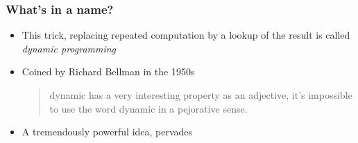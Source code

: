 \documentclass[presentation]{beamer}
\begin{document}
\begin{frame}
  \frametitle{What's in a name?}
  \begin{itemize}
  \item This trick, replacing repeated computation by a lookup of the
    result is called \emph{dynamic programming}
  \item Coined by Richard Bellman in the 1950s
    \begin{quote}
      dynamic {\normalfont[\dots]} has a very interesting property as an adjective,
      {\normalfont[\dots]} it's impossible to use the word dynamic in a pejorative
      sense.
    \end{quote}
  \item A tremendously powerful idea, pervades 
  \end{itemize}
\end{frame}


\end{document}
